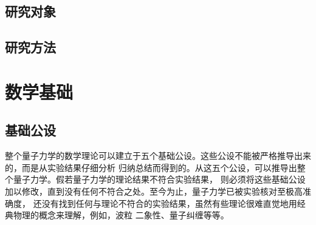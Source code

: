 \documentclass[type=doctor]{fduthesis}
\begin{document}
\section{研究对象}

\section{研究方法}

\chapter{数学基础}

\section{基础公设}

整个量子力学的数学理论可以建立于五个基础公设。这些公设不能被严格推导出来的，而是从实验结果仔细分析
归纳总结而得到的。从这五个公设，可以推导出整个量子力学。假若量子力学的理论结果不符合实验结果，
则必须将这些基础公设加以修改，直到没有任何不符合之处。至今为止，量子力学已被实验核对至极高准确度，
还没有找到任何与理论不符合的实验结果，虽然有些理论很难直觉地用经典物理的概念来理解，例如，波粒
二象性、量子纠缠等等\cite{zurek2014quantum,cohen2013claude,zettili2003quantum}。
\end{document}
